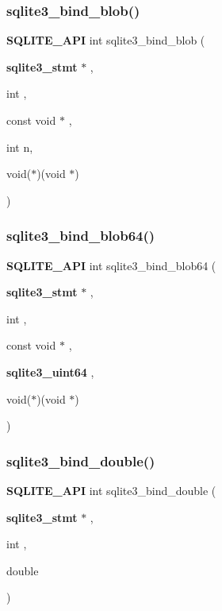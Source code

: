 \subsubsection{sqlite3\_bind\_blob()}
{\footnotesize\ttfamily \textbf{ S\+Q\+L\+I\+T\+E\+\_\+\+A\+PI} int sqlite3\+\_\+bind\+\_\+blob (\begin{DoxyParamCaption}\item[{\textbf{ sqlite3\+\_\+stmt} $\ast$}]{,  }\item[{int}]{,  }\item[{const void $\ast$}]{,  }\item[{int}]{n,  }\item[{void($\ast$)(void $\ast$)}]{ }\end{DoxyParamCaption})}

\mbox{\label{sqlite3_8h_a21616ad282a9d6ea45ee39746f81287a}} 
\subsubsection{sqlite3\_bind\_blob64()}
{\footnotesize\ttfamily \textbf{ S\+Q\+L\+I\+T\+E\+\_\+\+A\+PI} int sqlite3\+\_\+bind\+\_\+blob64 (\begin{DoxyParamCaption}\item[{\textbf{ sqlite3\+\_\+stmt} $\ast$}]{,  }\item[{int}]{,  }\item[{const void $\ast$}]{,  }\item[{\textbf{ sqlite3\+\_\+uint64}}]{,  }\item[{void($\ast$)(void $\ast$)}]{ }\end{DoxyParamCaption})}

\mbox{\label{sqlite3_8h_a8dc6f4de797850398e12e5022cae8915}} 
\subsubsection{sqlite3\_bind\_double()}
{\footnotesize\ttfamily \textbf{ S\+Q\+L\+I\+T\+E\+\_\+\+A\+PI} int sqlite3\+\_\+bind\+\_\+double (\begin{DoxyParamCaption}\item[{\textbf{ sqlite3\+\_\+stmt} $\ast$}]{,  }\item[{int}]{,  }\item[{double}]{ }\end{DoxyParamCaption})}

